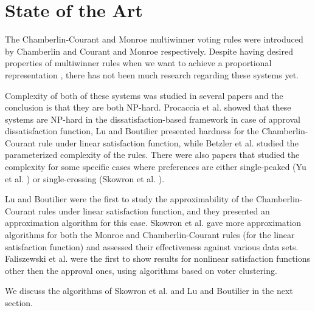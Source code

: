 \section{State of the Art}

The Chamberlin-Courant and Monroe multiwinner voting rules were introduced by Chamberlin and Courant \cite{9} and Monroe \cite{8} respectively. Despite having desired properties of multiwinner rules when we want to achieve a proportional representation \cite{10}, there has not been much research regarding these systems yet.

Complexity of both of these systems was studied in several papers and the conclusion is that they are both NP-hard. Procaccia et al. \cite{2} showed that these systems are NP-hard in the dissatisfaction-based framework in case of approval dissatisfaction function, Lu and Boutilier \cite{4} presented hardness for the Chamberlin-Courant rule under linear satisfaction function, while Betzler et al. \cite{3} studied the parameterized complexity of the rules. There were also papers that studied the complexity for some specific cases where preferences are either single-peaked (Yu et al. \cite{11}) or single-crossing (Skowron et al. \cite{12}).

Lu and Boutilier \cite{4} were the first to study the approximability of the Chamberlin-Courant rules under linear satisfaction function, and they presented an approximation algorithm for this case. Skowron et al. \cite{1} gave more approximation algorithms for both the Monroe and Chamberlin-Courant rules (for the linear satisfaction function) and assessed their effectiveness against various data sets. Faliszewski et al. \cite{14} were the first to show results for nonlinear satisfaction functions other then the approval ones, using algorithms based on voter clustering.

We discuss the algorithms of Skowron et al. \cite{2} and Lu and Boutilier \cite{4} in the next section.